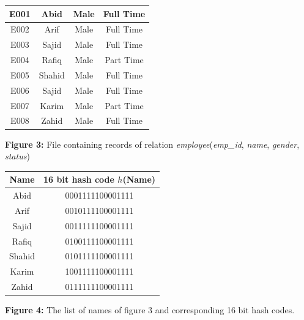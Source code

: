 \documentclass[12pt,a3paper]{article}
\begin{document}
\begin{enumerate}
\begin{center}
  \renewcommand{\arraystretch}{1.3} %
    \begin{tabular}{|c|c|c|c|}
        \hline
        E001 & Abid   & Male & Full Time \\ \hline
        E002 & Arif   & Male & Full Time \\ \hline
        E003 & Sajid  & Male & Full Time \\ \hline
        E004 & Rafiq  & Male & Part Time \\ \hline
        E005 & Shahid & Male & Full Time \\ \hline
        E006 & Sajid  & Male & Full Time \\ \hline
        E007 & Karim  & Male & Part Time \\ \hline
        E008 & Zahid  & Male & Full Time \\ \hline
    \end{tabular}
    
    \vspace{0.4cm}
    \textbf{Figure 3:} File containing records of relation \textit{employee}(\textit{emp\_id}, \textit{name}, \textit{gender}, \textit{status})
\end{center}
\vspace{0.5cm}
\begin{center}
  \renewcommand{\arraystretch}{1.3} %
    \begin{tabular}{|c|c|}
        \hline
        \textbf{Name} & \textbf{16 bit hash code $h$(Name)} \\ \hline
        Abid   & 0001111100001111 \\ \hline
        Arif   & 0010111100001111 \\ \hline
        Sajid  & 0011111100001111 \\ \hline
        Rafiq  & 0100111100001111 \\ \hline
        Shahid & 0101111100001111 \\ \hline
        Karim  & 1001111100001111 \\ \hline
        Zahid  & 0111111100001111 \\ \hline
    \end{tabular}
    
    \vspace{0.4cm}
    \textbf{Figure 4:} The list of names of figure 3 and corresponding 16 bit hash codes.
\end{center}


\end{enumerate}
\end{document}
